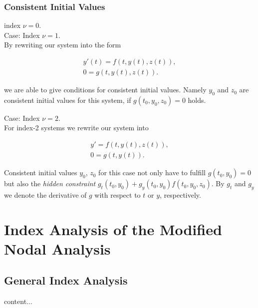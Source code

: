 	\subsubsection{Consistent Initial Values}
	\begin{frame}
		index $\nu = 0$.\\ 
		
		Case: Index $\nu = 1$.\\
		
			By rewriting our system into the form
			
			\begin{align*}
				y'(t) = f(t,y(t),z(t)), \\
				0 = g(t,y(t),z(t)).
			\end{align*}
			
			we are able to give conditions for consistent initial values. Namely $y_0$ and $z_0$ are consistent initial values for this system, if $g(t_0, y_0, z_0) = 0$ holds.
			
	\end{frame}

	\begin{frame}
		Case: Index $\nu = 2$.\\
		
		For index-2 systems we rewrite our system into
		
		\begin{align*}
			y' = f(t,y(t),z(t)), \\
			0 = g(t,y(t)).
		\end{align*}
		
		Consistent initial values $y_0$, $z_0$ for this case not only have to fulfill $g(t_0, y_0) = 0$ but also the \emph{hidden constraint} $g_t(t_0, y_0) + g_y(t_0, y_0)f(t_0, y_0, z_0)$. By $g_t$ and $g_y$ we denote the derivative of $g$ with respect to $t$ or $y$, respectively.
	\end{frame}

\section*{Index Analysis of the Modified Nodal Analysis}
	\subsection{General Index Analysis}
	\begin{frame}
		content...
	\end{frame}
